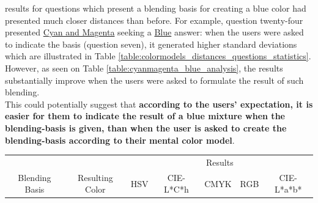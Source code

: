 \begin{itemize}
  results for questions which present a blending basis for creating a blue color had presented much closer distances than before. For example, question twenty-four presented \ul{Cyan and Magenta} seeking a \ul{Blue}
  answer: when the users were asked to indicate the basis (question seven), it generated higher standard deviations which are illustrated in Table \ref{table:colormodels_distances_questions_statistics}. However, as
  seen on Table \ref{table:cyanmagenta_blue_analysis}, the results substantially improve when the users were asked to formulate the result of such blending. \\
  This could potentially suggest that \textbf{according to the users' expectation, it is easier for them to indicate the result of a blue mixture when the blending-basis is given, than when the user is asked
  to create the blending-basis according to their mental color model}.
  \begin{table}[H]
    \resizebox{\textwidth}{!} {
    \begin{tabular}{ccccccccccccc}
      \hline
      \multicolumn{2}{c}{}                                        &                                                          & \multicolumn{10}{c}{Results}                                                                                                                                                                                                                                                                                                                                                                                                                                                                                                                                                             \\ \cline{4-13}
      \multicolumn{2}{c}{\multirow{-2}{*}{Blending Basis}}        & \multirow{-2}{*}{Resulting Color}                        & \multicolumn{2}{c}{HSV}                                                                                              & \multicolumn{2}{c}{CIE-L*C*h}                                                                                        & \multicolumn{2}{c}{CMYK}                                                                                             & \multicolumn{2}{c}{RGB}                                                                                              & \multicolumn{2}{c}{CIE-L*a*b*}                                                               \\ \hline

\end{tabular}}
\end{table}
\end{itemize}
